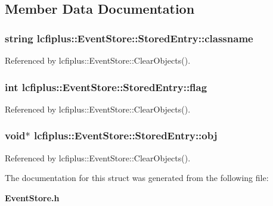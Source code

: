 \subsection{Member Data Documentation}
\subsubsection[{classname}]{\setlength{\rightskip}{0pt plus 5cm}string lcfiplus\-::\-Event\-Store\-::\-Stored\-Entry\-::classname}\label{structlcfiplus_1_1EventStore_1_1StoredEntry_ac77dec9a4b4f6af998370ac130707d9a}


Referenced by lcfiplus\-::\-Event\-Store\-::\-Clear\-Objects().

\subsubsection[{flag}]{\setlength{\rightskip}{0pt plus 5cm}int lcfiplus\-::\-Event\-Store\-::\-Stored\-Entry\-::flag}\label{structlcfiplus_1_1EventStore_1_1StoredEntry_ac4d939f4f3ffdbf38e2859766b01524d}


Referenced by lcfiplus\-::\-Event\-Store\-::\-Clear\-Objects().

\subsubsection[{obj}]{\setlength{\rightskip}{0pt plus 5cm}void$\ast$ lcfiplus\-::\-Event\-Store\-::\-Stored\-Entry\-::obj}\label{structlcfiplus_1_1EventStore_1_1StoredEntry_a538fa2e380be618431ba8096e26940b1}


Referenced by lcfiplus\-::\-Event\-Store\-::\-Clear\-Objects().



The documentation for this struct was generated from the following file\-:\begin{DoxyCompactItemize}
\item 
{\bf Event\-Store.\-h}\end{DoxyCompactItemize}
